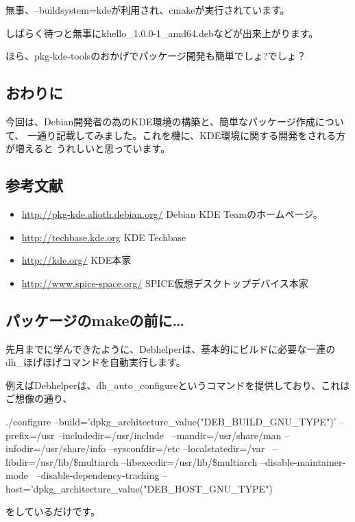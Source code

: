\documentclass[mingoth,a4paper]{jsarticle}
\begin{document}
 無事、--buildsystem=kdeが利用され、cmakeが実行されています。

 しばらく待つと無事にkhello\_1.0.0-1\_amd64.debなどが出来上がります。

 ほら、pkg-kde-toolsのおかげでパッケージ開発も簡単でしょ?でしょ？

\subsection{おわりに}

 今回は、Debian開発者の為のKDE環境の構築と、簡単なパッケージ作成について、
一通り記載してみました。これを機に、KDE環境に関する開発をされる方が増えると
うれしいと思っています。

\subsection{参考文献}

\begin{itemize}
\item \url{http://pkg-kde.alioth.debian.org/} Debian KDE Teamのホームページ。
\item \url{http://techbase.kde.org} KDE Techbase
\item \url{http://kde.org/} KDE本家
\item \url{http://www.spice-space.org/} SPICE仮想デスクトップデバイス本家
\end{itemize}



\subsection{パッケージのmakeの前に…}

先月までに学んできたように、Debhelperは、基本的にビルドに必要な一連のdh\_ほげほげコマンドを自動実行します。

例えばDebhelperは、dh\_auto\_configureというコマンドを提供しており、これはご想像の通り、
\begin{commandline}
./configure --build='dpkg_architecture_value("DEB_BUILD_GNU_TYPE")' --prefix=/usr --includedir=/usr/include \
--mandir=/usr/share/man --infodir=/usr/share/info --sysconfdir=/etc --localstatedir=/var \
--libdir=/usr/lib/\$multiarch --libexecdir=/usr/lib/\$multiarch --disable-maintainer-mode \
--disable-dependency-tracking --host='dpkg_architecture_value("DEB_HOST_GNU_TYPE")
\end{commandline}
をしているだけです。
\end{document}
